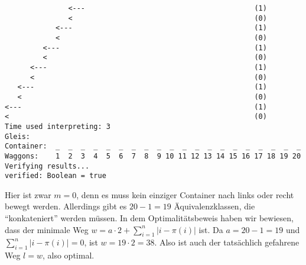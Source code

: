 \begin{lstlisting}
               <---                                        (1)
               <                                           (0)
            <---                                           (1)
            <                                              (0)
         <---                                              (1)
         <                                                 (0)
      <---                                                 (1)
      <                                                    (0)
   <---                                                    (1)
   <                                                       (0)
<---                                                       (1)
<                                                          (0)
Time used interpreting: 3
Gleis: 
Container:  _  _  _  _  _  _  _  _  _  _  _  _  _  _  _  _  _  _  _  _
Waggons:    1  2  3  4  5  6  7  8  9 10 11 12 13 14 15 16 17 18 19 20
Verifying results...
verified: Boolean = true
\end{lstlisting}
Hier ist zwar $m = 0$, denn es muss kein einziger Container nach links oder recht bewegt werden.
Allerdings gibt es $20-1=19$ Äquivalenzklassen, die ``konkateniert'' werden müssen.
In dem Optimalitätsbeweis haben wir bewiesen, dass der minimale Weg $w = a \cdot 2 + \sum_{i = 1}^{n}{\lvert i-\pi(i)\rvert}$ ist.
Da $a=20-1=19$ und $\sum_{i = 1}^{n}{\lvert i-\pi(i)\rvert} = 0$, ist $w = 19 \cdot 2 = 38$. Also ist auch der tatsächlich gefahrene Weg $l = w$, also optimal.
